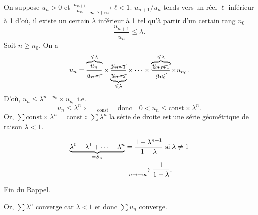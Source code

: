\begin{prv}
	On suppose $u_n > 0$\/ et $\frac{u_{n+1}}{u_n} \tendsto{n\to +\infty} \ell < 1$.
	$u_{n+1} / u_n$\/ tends vers un réel $\ell$\/ inférieur à 1 d'où, il existe un certain $\lambda$\/ inférieur à 1 tel qu'à partir d'un certain rang $n_0$\/ \[
		\frac{u_{n+1}}{u_n} \le \lambda
	.\]Soit $n \ge n_0$. On a \[
		u_n = \overbrace{\frac{u_n}{\cancel{u_{n-1}}}}^{\le \lambda} \times \underbrace{\frac{\cancel{u_{n-1}}}{\cancel{u_{n-2}}}}_{\le \lambda} \times \cdots \times \overbrace{\frac{\cancel{u_{n_0 + 1}}}{\cancel{u_{n_0}}}}^{\le \lambda} \times u_{n_0}
	.\]
	D'où, $u_n \le \lambda^{n - n_0} \times u_{n_0}$ i.e. \[
		u_n \le \lambda^n \times \mathop{\boxed{\frac{u_{n_0}}{\lambda^{n_0}}}}_{=\mathrm{const}}\quad\text{donc}\quad 0 < u_n \le \mathrm{const}\times \lambda^n
	.\]
	Or, $\sum \mathrm{const} \times \lambda^n = \mathrm{const} \times \sum \lambda^n$\/ la série de droite est une série géométrique de raison $\lambda < 1$.

	\begin{rap}
		\begin{align*}
			\underbrace{\lambda^0 + \lambda^1 + \cdots + \lambda^n}_{= S_n} &= \frac{1 - \lambda^{n+1}}{1 - \lambda} \text{ si } \lambda \neq 1\\
			&\tendsto{n\to +\infty} \frac{1}{1-\lambda}.
		\end{align*}
	\end{rap}
	\noindent Fin du {\sc Rappel}.

	\bigskip

	Or, $\sum \lambda^n$\/ converge car $\lambda < 1$\/ et donc $\sum u_n$\/ converge.
\end{prv}

\begin{rmk}
\end{rmk}

